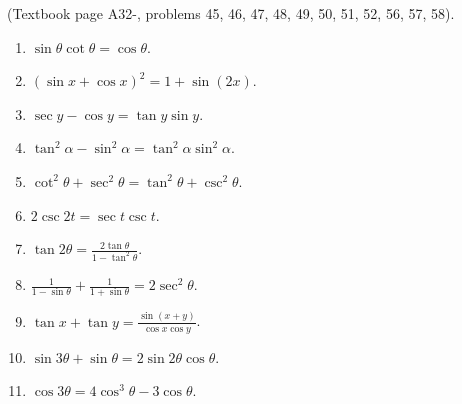 \begin{problem}
(Textbook page A32-, problems 45, 46, 47, 48, 49, 50, 51, 52, 56, 57, 58).
\begin{multicols}{3}
\begin{enumerate}
\item $\sin \theta\cot \theta =\cos \theta$.
\item $(\sin x +\cos x)^2=1+\sin(2x)$.
\item $\sec y - \cos y= \tan y \sin y$.
\item $\tan^2 \alpha-\sin^2 \alpha=\tan^2\alpha\sin^2\alpha$.
\item $\cot^2\theta+\sec^2\theta=\tan^2\theta+\csc^2\theta$.
\item $2\csc 2t= \sec t \csc t$.
\item $\tan 2\theta =\frac{2\tan \theta}{1-\tan^2\theta} $.
\item $\frac{1}{1-\sin \theta}+ \frac{1}{1+\sin \theta}=2\sec^2\theta$.
\item $\tan x + \tan y = \frac{\sin (x+y)}{\cos x \cos y}$.
\item $\sin 3\theta +\sin \theta = 2 \sin 2\theta \cos \theta $.
\item $\cos 3\theta = 4\cos^3\theta-3\cos \theta $.
\end{enumerate} 
\end{multicols}
\end{problem}